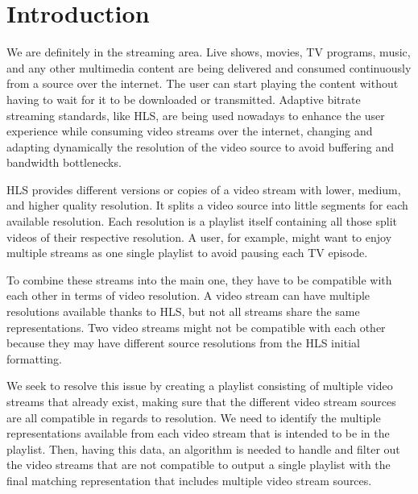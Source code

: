 \section{\textbf{Introduction}}\label{sec:Introduction}
We are definitely in the streaming area. Live shows, movies, TV programs, music, and any other multimedia content are being delivered and consumed continuously from a source over the internet. The user can start playing the content without having to wait for it to be downloaded or transmitted. Adaptive bitrate streaming standards, like HLS, are being used nowadays to enhance the user experience while consuming video streams over the internet, changing and adapting dynamically the resolution of the video source to avoid buffering and bandwidth bottlenecks.

HLS provides different versions or copies of a video stream with lower, medium, and higher quality resolution. It splits a video source into little segments for each available resolution. Each resolution is a playlist itself containing all those split videos of their respective resolution. A user, for example, might want to enjoy multiple streams as one single playlist to avoid pausing each TV episode.

To combine these streams into the main one, they have to be compatible with each other in terms of video resolution. A video stream can have multiple resolutions available thanks to HLS, but not all streams share the same representations. Two video streams might not be compatible with each other because they may have different source resolutions from the HLS initial formatting.

We seek to resolve this issue by creating a playlist consisting of multiple video streams that already exist, making sure that the different video stream sources are all compatible in regards to resolution. We need to identify the multiple representations available from each video stream that is intended to be in the playlist. Then, having this data, an algorithm is needed to handle and filter out the video streams that are not compatible to output a single playlist with the final matching representation that includes multiple video stream sources.
